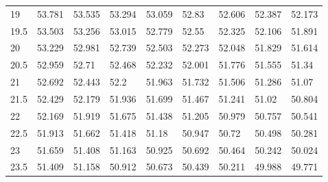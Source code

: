 \begin{bibunit}
\begin{table}[]
\begin{tabular}{lllllllll}
					19   & 53.781 & 53.535 & 53.294 & 53.059 & 52.83  & 52.606 & 52.387 & 52.173 \\
					19.5 & 53.503 & 53.256 & 53.015 & 52.779 & 52.55  & 52.325 & 52.106 & 51.891 \\
					20   & 53.229 & 52.981 & 52.739 & 52.503 & 52.273 & 52.048 & 51.829 & 51.614 \\
					20.5 & 52.959 & 52.71  & 52.468 & 52.232 & 52.001 & 51.776 & 51.555 & 51.34  \\
					21   & 52.692 & 52.443 & 52.2   & 51.963 & 51.732 & 51.506 & 51.286 & 51.07  \\
					21.5 & 52.429 & 52.179 & 51.936 & 51.699 & 51.467 & 51.241 & 51.02  & 50.804 \\
					22   & 52.169 & 51.919 & 51.675 & 51.438 & 51.205 & 50.979 & 50.757 & 50.541 \\
					22.5 & 51.913 & 51.662 & 51.418 & 51.18  & 50.947 & 50.72  & 50.498 & 50.281 \\
					23   & 51.659 & 51.408 & 51.163 & 50.925 & 50.692 & 50.464 & 50.242 & 50.024 \\
					23.5 & 51.409 & 51.158 & 50.912 & 50.673 & 50.439 & 50.211 & 49.988 & 49.771\\
		\midrule
	\end{tabular}
\end{table}

\end{bibunit}